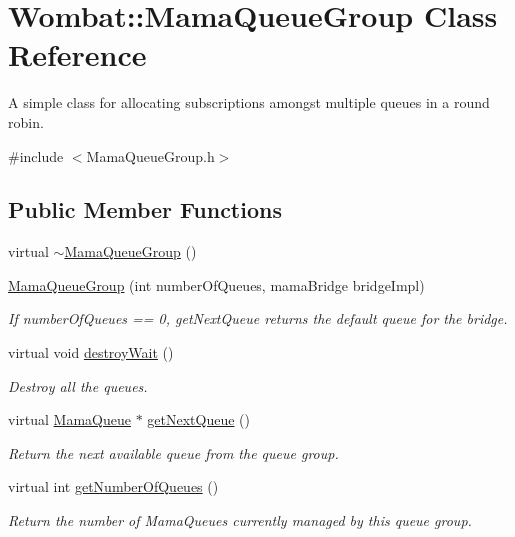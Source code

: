 \hypertarget{classWombat_1_1MamaQueueGroup}{
\section{Wombat::MamaQueueGroup Class Reference}
\label{classWombat_1_1MamaQueueGroup}
}


A simple class for allocating subscriptions amongst multiple queues in a round robin.  


{\ttfamily \#include $<$MamaQueueGroup.h$>$}\subsection*{Public Member Functions}
\begin{DoxyCompactItemize}
\item 
virtual \hyperlink{classWombat_1_1MamaQueueGroup_aa24c28b26b494f159b8c7c5f5cb3e328}{$\sim$MamaQueueGroup} ()
\item 
\hyperlink{classWombat_1_1MamaQueueGroup_a132745778e569ecc287f7a21aaac7028}{MamaQueueGroup} (int numberOfQueues, mamaBridge bridgeImpl)
\begin{DoxyCompactList}\small\item\em If numberOfQueues == 0, getNextQueue returns the default queue for the bridge. \item\end{DoxyCompactList}\item 
virtual void \hyperlink{classWombat_1_1MamaQueueGroup_a1fca2ac74bb5f6a211aba98149509e0d}{destroyWait} ()
\begin{DoxyCompactList}\small\item\em Destroy all the queues. \item\end{DoxyCompactList}\item 
virtual \hyperlink{classWombat_1_1MamaQueue}{MamaQueue} $\ast$ \hyperlink{classWombat_1_1MamaQueueGroup_a4b1c1691e8b9c94ac5606bb6f64fc543}{getNextQueue} ()
\begin{DoxyCompactList}\small\item\em Return the next available queue from the queue group. \item\end{DoxyCompactList}\item 
virtual int \hyperlink{classWombat_1_1MamaQueueGroup_a8e5ffd601eaa994a2996b0d6ad9ca2ee}{getNumberOfQueues} ()
\begin{DoxyCompactList}\small\item\em Return the number of MamaQueues currently managed by this queue group. \item\end{DoxyCompactList}\item 

\end{DoxyCompactItemize}

